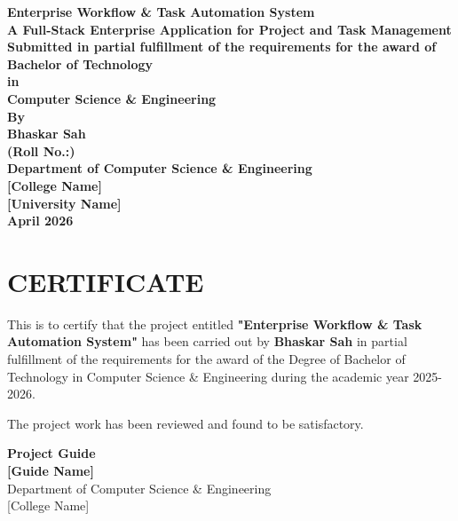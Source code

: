 \documentclass[12pt,a4paper,twoside]{book}
\begin{document}
\begin{titlepage}
\begin{center}
\vspace*{2cm}
\textbf{\Huge Enterprise Workflow \& Task Automation System}\\[0.5cm]
\textbf{\Large A Full-Stack Enterprise Application for Project and Task Management}\\[2cm]

\textbf{Submitted in partial fulfillment of the requirements for the award of}\\[1cm]

\textbf{Bachelor of Technology}\\[0.5cm]
\textbf{in}\\[0.5cm]
\textbf{Computer Science \& Engineering}\\[2cm]

\textbf{By}\\[1cm]
\textbf{Bhaskar Sah}\\[0.5cm]
\textbf{(Roll No.:)}\\[2cm]

\textbf{Department of Computer Science \& Engineering}\\[0.5cm]
\textbf{[College Name]}\\[0.5cm]
\textbf{[University Name]}\\[2cm]

\textbf{April 2026}
\end{center}
\end{titlepage}

\thispagestyle{empty}

\newpage
\section*{CERTIFICATE}

This is to certify that the project entitled \textbf{"Enterprise Workflow \& Task Automation System"} has been carried out by \textbf{Bhaskar Sah} in partial fulfillment of the requirements for the award of the Degree of Bachelor of Technology in Computer Science \& Engineering during the academic year 2025-2026.

The project work has been reviewed and found to be satisfactory.

\bigskip
\bigskip
\bigskip

\textbf{Project Guide}\\
\textbf{[Guide Name]}\\
Department of Computer Science \& Engineering\\
{[College Name]}
\end{document}
